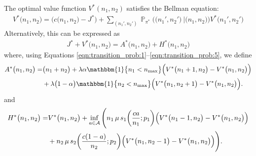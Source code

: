 \documentclass[11pt]{article}
\newcommand{\jp}[1]{\footnote{J-P: #1}}
\theoremstyle{remark}
\theoremstyle{definition}
\DeclareMathOperator{\prob}{\mathbb{P}}
\numberwithin{equation}{section}
\begin{document}
The optimal value function \( V^*(n_1, n_2) \) satisfies the Bellman equation:
\begin{align*}
    V^*\big(n_1, n_2\big) = \Big(c\big(n_1, n_2\big) - J^*\Big) + \sum_{(n_1', n_2')} \prob_{\pi^*}\Big(\big(n_1',n_2'\big) \ \Big\vert \big(n_1, n_2\big) \Big) V^*\big(n_1', n_2'\big)
\end{align*}
Alternatively, this can be expressed as
\begin{align*}
    J^* + V^{*}\big(n_1, n_2\big) = A^{*}\big(n_1, n_2\big) + H^{*}\big(n_1, n_2\big)
\end{align*}
where, using Equations \eqref{eqn:transition_prob:1}--\eqref{eqn:transition_prob:5}, we define
\begin{align}\label{eqn: defn: A}
    A^{*}\big(n_1, n_2\big) = &\big(n_1 + n_2\big) + \lambda \alpha \mathbbm{1}\big\{n_1 < n_{\max}\big\} \Big(V^{*}\big(n_1+1, n_2\big) - V^{*}\big(n_1, n_2\big)\Big) \notag
    \\
    &+ \lambda \big(1-\alpha\big) \mathbbm{1}\big\{n_2 < n_{\max}\big\} \Big(V^{*}\big(n_1, n_2+1\big) - V^{*}\big(n_1, n_2\big)\Big).
\end{align}
and
\begin{align} \label{eqn: defn: H}
    H^{*}\big(n_1, n_2\big) = &V^{*}\big(n_1, n_2\big) + \inf_{a \in \mathcal{A}} \Bigg(n_1 \, \mu \, s_1\bigg(\frac{ca}{n_1}; p_1\bigg) \Big(V^{*}\big(n_1-1, n_2\big) - V^{*}\big(n_1, n_2\big)\Big) \notag
    \\
    &+ n_2 \, \mu \, s_2\bigg(\frac{c(1-a)}{n_2}; p_2\bigg) \Big(V^{*}\big(n_1, n_2-1\big) - V^{*}\big(n_1, n_2\big)\Big) \Bigg).
\end{align}
\end{document}
